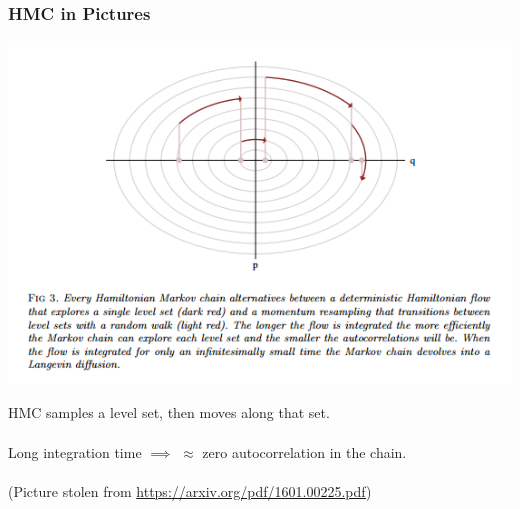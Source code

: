 \documentclass[xcolor=dvipsnames]{beamer}
\begin{document}
\begin{frame}
\frametitle{HMC in Pictures}
\begin{center}
\includegraphics[height=0.5\textheight]{hmc.png}
\end{center}

HMC samples a level set, then moves along that set.\\~\\


Long integration time $\implies$ $\approx$ zero autocorrelation in the chain.\\~\\

(Picture stolen from \url{https://arxiv.org/pdf/1601.00225.pdf})
\end{frame}
\end{document}
